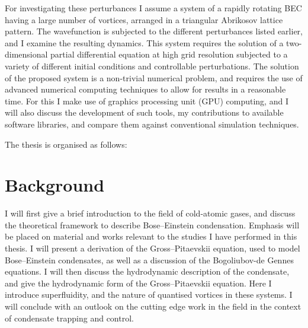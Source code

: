 For investigating these perturbances I assume a system of a rapidly rotating BEC having a large number of vortices, arranged in a triangular Abrikosov lattice pattern. The wavefunction is subjected to the different perturbances listed earlier, and I examine the resulting dynamics. This system requires the solution of a two-dimensional partial differential equation at high grid resolution subjected to a variety of different initial conditions and controllable perturbations. The solution of the proposed system is a non-trivial numerical problem, and requires the use of advanced numerical computing techniques to allow for results in a reasonable time. For this I make use of graphics processing unit (GPU) computing, and I will also discuss the development of such tools, my contributions to available software libraries, and compare them against conventional simulation techniques.

The thesis is organised as follows:

\section{Background}
I will first give a brief introduction to the field of cold-atomic gases, and discuss the theoretical framework to describe Bose--Einstein condensation. Emphasis will be placed on material and works relevant to the studies I have performed in this thesis. I will present a derivation of the Gross--Pitaevskii equation, used to model Bose--Einstein condensates, as well as a discussion of the Bogoliubov-de Gennes equations. I will then discuss the hydrodynamic description of the condensate, and give the hydrodynamic form of the Gross--Pitaevskii equation. Here I introduce superfluidity, and the nature of quantised vortices in these systems. I will conclude with an outlook on the cutting edge work in the field in the context of condensate trapping and control.


